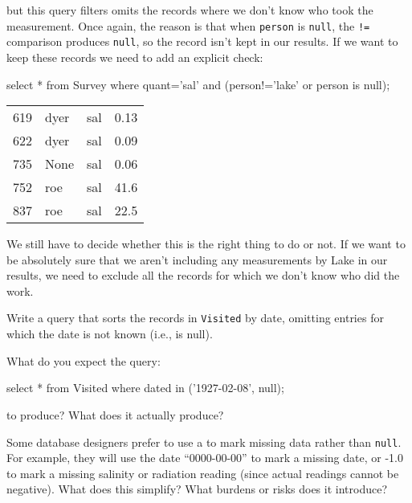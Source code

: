 \documentclass{book}
\begin{document}
but this query filters omits the records where we don't know who took
the measurement. Once again, the reason is that when \texttt{person} is
\texttt{null}, the \texttt{!=} comparison produces \texttt{null}, so the
record isn't kept in our results. If we want to keep these records we
need to add an explicit check:

\begin{VerbIn}
select * from Survey where quant='sal' and (person!='lake' or person is null);
\end{VerbIn}

\begin{tabular}{llll}
619 & dyer & sal & 0.13 \\
622 & dyer & sal & 0.09 \\
735 & None & sal & 0.06 \\
752 & roe & sal & 41.6 \\
837 & roe & sal & 22.5 \\
\end{tabular}

We still have to decide whether this is the right thing to do or not. If
we want to be absolutely sure that we aren't including any measurements
by Lake in our results, we need to exclude all the records for which we
don't know who did the work.

\begin{challenge}
  Write a query that sorts the records in \texttt{Visited} by date,
  omitting entries for which the date is not known (i.e., is null).
\end{challenge}

\begin{challenge}
  What do you expect the query:

\begin{VerbIn}
select * from Visited where dated in ('1927-02-08', null);
\end{VerbIn}

  to produce? What does it actually produce?
\end{challenge}

\begin{challenge}
  Some database designers prefer to use a
   to mark missing data
  rather than \texttt{null}. For example, they will use the date
  ``0000-00-00'' to mark a missing date, or -1.0 to mark a missing
  salinity or radiation reading (since actual readings cannot be
  negative). What does this simplify? What burdens or risks does it
  introduce?
\end{challenge}
\end{document}
